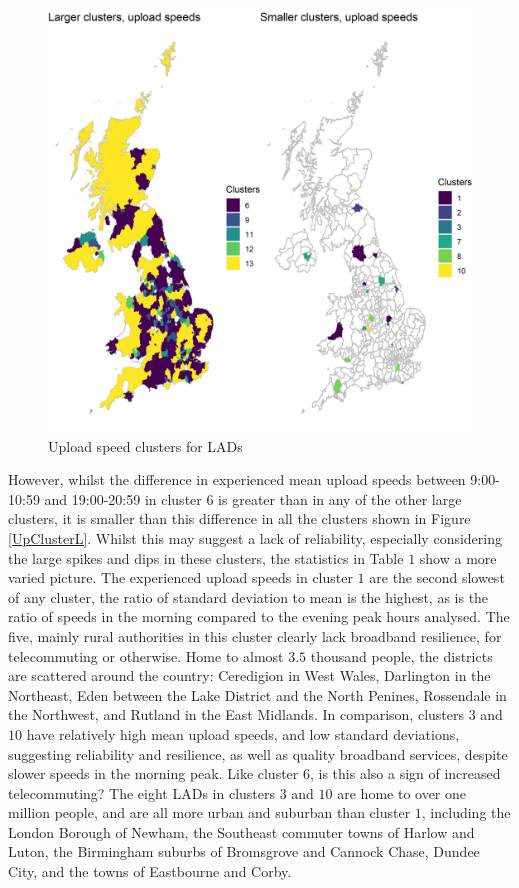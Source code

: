 \documentclass[]{interact}
\theoremstyle{plain}%
\theoremstyle{definition}
\theoremstyle{remark}
\begin{document}
\begin{figure}
\includegraphics[width=0.95\linewidth]{figures/map.up.clusters} \caption{\label{map.up.clusters}Upload speed clusters for LADs}\label{fig:unnamed-chunk-5}
\end{figure}

However, whilst the difference in experienced mean upload speeds between
9:00-10:59 and 19:00-20:59 in cluster \(6\) is greater than in any of
the other large clusters, it is smaller than this difference in all the
clusters shown in Figure \ref{UpClusterL}. Whilst this may suggest a
lack of reliability, especially considering the large spikes and dips in
these clusters, the statistics in Table \(1\) show a more varied
picture. The experienced upload speeds in cluster \(1\) are the second
slowest of any cluster, the ratio of standard deviation to mean is the
highest, as is the ratio of speeds in the morning compared to the
evening peak hours analysed. The five, mainly rural authorities in this
cluster clearly lack broadband resilience, for telecommuting or
otherwise. Home to almost \(3.5\) thousand people, the districts are
scattered around the country: Ceredigion in West Wales, Darlington in
the Northeast, Eden between the Lake District and the North Penines,
Rossendale in the Northwest, and Rutland in the East Midlands. In
comparison, clusters \(3\) and \(10\) have relatively high mean upload
speeds, and low standard deviations, suggesting reliability and
resilience, as well as quality broadband services, despite slower speeds
in the morning peak. Like cluster \(6\), is this also a sign of
increased telecommuting? The eight LADs in clusters \(3\) and \(10\) are
home to over one million people, and are all more urban and suburban
than cluster \(1\), including the London Borough of Newham, the
Southeast commuter towns of Harlow and Luton, the Birmingham suburbs of
Bromsgrove and Cannock Chase, Dundee City, and the towns of Eastbourne
and Corby.
\end{document}
